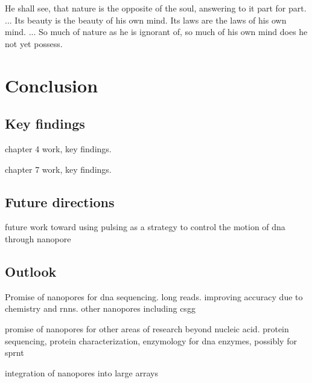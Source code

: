 \begin{savequote}[75mm]
He shall see, that nature is the opposite of the soul, answering to it part for part. ... Its beauty is the beauty of his own mind. Its laws are the laws of his own mind. ... So much of nature as he is ignorant of, so much of his own mind does he not yet possess.
\end{savequote}

\chapter{Conclusion}
\label{conclusion}

\section{Key findings}

chapter 4 work, key findings.

chapter 7 work, key findings.

\section{Future directions}

future work toward using pulsing as a strategy to control the motion of dna through nanopore

\section{Outlook}

Promise of nanopores for dna sequencing.  long reads.  improving accuracy due to chemistry and rnns.  other nanopores including csgg

promise of nanopores for other areas of research beyond nucleic acid.  protein sequencing, protein characterization, enzymology for dna enzymes, possibly for sprnt

integration of nanopores into large arrays
